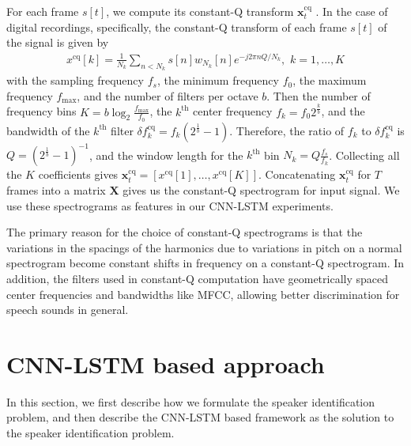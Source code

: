 \documentclass[a4paper]{article}
\begin{document}
For each frame $s[t]$, we compute its constant-Q transform $\mathbf{x}_t^{\mathrm{cq}}$  \cite{brown1991calculation}. In the case of digital recordings, specifically, the constant-Q transform of each frame $s[t]$ of the signal is given by
\begin{align}
x^{\mathrm{cq}}[k] = \tfrac1{N_k} \sum_{n < N_k} s[n]w_{N_k}[n]e^{-j2\pi nQ/N_k},\,\, k = 1,\ldots,K
\label{eq:const_q}
\end{align}
with the sampling frequency $f_s$, the minimum frequency $f_0$, the maximum frequency $f_{\mathrm{max}}$, and the number of filters per octave $b$. Then the number of frequency bins $K=b \log_2 \frac{f_\mathrm{max}}{f_0}$, the $k^{\mathrm{th}}$ center frequency $f_k = f_0 2^{\frac{k}{b}}$, and the bandwidth of the $k^{\mathrm{th}}$ filter $\delta f_k^{\mathrm{cq}} = f_k(2^{\tfrac1{b}}-1)$. Therefore, the ratio of $f_k$ to $\delta f_k^{\mathrm{cq}}$ is $Q = (2^{\tfrac1{b}}-1)^{-1}$, and the window length for the $k^{\mathrm{th}}$ bin $N_k = Q\frac{f_s}{f_k}$.
Collecting all the $K$ coefficients gives $\mathbf{x}_t^{\mathrm{cq}} = \left[x^{\mathrm{cq}}[1], \ldots, x^{\mathrm{cq}}[K]\right]$. Concatenating $\mathbf{x}_t^{\mathrm{cq}}$ for $T$ frames into a matrix $\mathbf{X}$ gives us the constant-Q spectrogram for input signal. We use these spectrograms as features in our CNN-LSTM experiments.

The primary reason for the choice of constant-Q spectrograms is that the variations in the spacings of the harmonics due to variations in pitch on a normal spectrogram become constant shifts in frequency on a constant-Q spectrogram. In addition, the filters used in constant-Q computation have geometrically spaced center frequencies and bandwidths like MFCC, allowing better discrimination for speech sounds in general.

\section{CNN-LSTM based approach}\label{sec:classifiers}
In this section, we first describe how we formulate the speaker identification problem, and then describe the CNN-LSTM based framework as the solution to the speaker identification problem.
\end{document}
